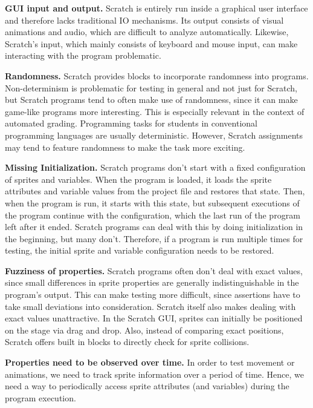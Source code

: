 \textbf{GUI input and output.}
Scratch is entirely run inside a graphical user interface and therefore lacks traditional IO mechanisms.
Its output consists of visual animations and audio, which are difficult to analyze automatically.
Likewise, Scratch's input, which mainly consists of keyboard and mouse input, can make interacting with the program problematic.
\parspace

\textbf{Randomness.}
Scratch provides blocks to incorporate randomness into programs.
Non-determinism is problematic for testing in general and not just for Scratch,
but Scratch programs tend to often make use of randomness,
since it can make game-like programs more interesting.
This is especially relevant in the context of automated grading.
Programming tasks for students in conventional programming languages are usually deterministic.
However, Scratch assignments may tend to feature randomness to make the task more exciting.
\parspace

\textbf{Missing Initialization.}
Scratch programs don't start with a fixed configuration of sprites and variables.
When the program is loaded, it loads the sprite attributes and variable values from the project file and restores that state.
Then, when the program is run, it starts with this state, but subsequent executions of the program continue with the configuration,
which the last run of the program left after it ended.
Scratch programs can deal with this by doing initialization in the beginning, but many don't.
Therefore, if a program is run multiple times for testing, the initial sprite and variable configuration needs to be restored.
\parspace

\textbf{Fuzziness of properties.}
Scratch programs often don't deal with exact values,
since small differences in sprite properties are generally indistinguishable in the program's output.
This can make testing more difficult, since assertions have to take small deviations into consideration.
Scratch itself also makes dealing with exact values unattractive.
In the Scratch GUI, sprites can initially be positioned on the stage via drag and drop.
Also, instead of comparing exact positions, Scratch offers built in blocks to directly check for sprite collisions.
\parspace

\textbf{Properties need to be observed over time.}
In order to test movement or animations, we need to track sprite information over a period of time.
Hence, we need a way to periodically access sprite attributes (and variables) during the program execution.
\parspace
